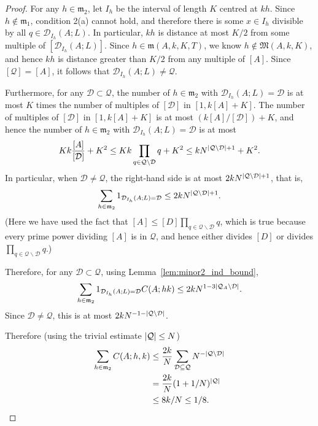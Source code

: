 \begin{proof}
  \leanok
{}
For any $h\in\mathfrak{m}_2$, let $I_h$ be the interval of length $K$ centred at $kh$. Since $h\not\in\mathfrak{m}_1$, condition 2(a) cannot hold, and therefore there is some $x\in I_h$ divisible by all $q\in\mathcal{D}_{I_h}(A;L)$. In particular, $kh$ is distance at most $K/2$ from some multiple of $[\mathcal{D}_{I_h}(A;L)]$. Since $h\in \mathfrak{m}(A,k,K,T)$, we know $h\not\in \mathfrak{M}(A,k,K)$, and hence $kh$ is distance greater than $K/2$ from any multiple of $[A]$. Since $[\mathcal{Q}]=[A]$, it follows that $\mathcal{D}_{I_h}(A;L)\neq \mathcal{Q}$.

Furthermore, for any $\mathcal{D}\subset \mathcal{Q}$, the number of $h\in\mathfrak{m}_2$ with $\mathcal{D}_{I_h}(A;L)=\mathcal{D}$ is at most $K$ times the number of multiples of $[\mathcal{D}]$ in $[1,k[A]+K]$. The number of multiples of $[\mathcal{D}]$ in $[1,k[A]+K]$ is at most $(k[A]/[\mathcal{D}])+K$, and hence the number of $h\in\mathfrak{m}_2$ with $\mathcal{D}_{I_h}(A;L)=\mathcal{D}$ is at most
\[Kk\frac{[A]}{[\mathcal{D}]} +K^2\leq Kk\prod_{q\in\mathcal{Q}\backslash\mathcal{D}}q+K^2\leq kN^{\left\lvert \mathcal{Q}\backslash \mathcal{D}\right\rvert+1}+K^2.\]
In particular, when $\mathcal{D}\neq \mathcal{Q}$, the right-hand side is at most $2kN^{\left\lvert \mathcal{Q}\backslash \mathcal{D}\right\rvert+1}$, that is,
\[\sum_{h\in \mathfrak{m}_2}1_{\mathcal{D}_{I_h}(A;L)=\mathcal{D}}\leq 2kN^{\left\lvert \mathcal{Q}\backslash \mathcal{D}\right\rvert+1}.\]
(Here we have used the fact that $[A]\leq [D]\prod_{q\in \mathcal{Q}\backslash \mathcal{D}}q$, which is true because every prime power dividing $[A]$ is in $\mathcal{Q}$, and hence either divides $[D]$ or divides $\prod_{q\in \mathcal{Q}\backslash \mathcal{D}}q$.)

Therefore, for any $\mathcal{D}\subset\mathcal{Q}$, using Lemma~\ref{lem:minor2_ind_bound},
\[\sum_{h\in \mathfrak{m}_2}1_{\mathcal{D}_{I_h}(A;L)=\mathcal{D}}C(A;hk)\leq 2kN^{1-3\left\lvert \mathcal{Q}_A\backslash\mathcal{D}\right\rvert}.\]
Since $\mathcal{D}\neq \mathcal{Q}$, this is at most $2kN^{-1-\left\lvert \mathcal{Q}\backslash \mathcal{D}\right\rvert}$.

 Therefore (using the trivial estimate $\left\lvert \mathcal{Q}\right\rvert\leq N$)
\begin{align*}
\sum_{h\in\mathfrak{m}_2}C(A;h,k)
&\leq
\frac{2k}{N}\sum_{\mathcal{D}\subseteq\mathcal{Q}}N^{-\left\lvert \mathcal{Q}\backslash \mathcal{D}\right\rvert}\\
&= \frac{2k}{N}(1+1/N)^{\left\lvert \mathcal{Q}\right\rvert}\\
&\leq 8k/N \leq 1/8.
\end{align*}
\end{proof}

